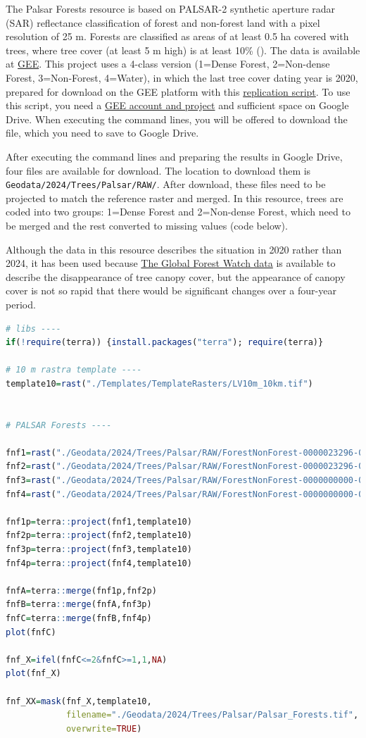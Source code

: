 \documentclass[
]{book}
\newcommand{\passthrough}[1]{#1}
\begin{document}
The Palsar Forests resource is based on PALSAR-2 synthetic aperture radar (SAR)
reflectance classification of forest and non-forest land with a pixel
resolution of 25 m. Forests are classified as areas of at least 0.5 ha covered
with trees, where tree cover (at least 5 m high) is at least 10\% ().
The data is available at \href{https://developers.google.com/earth-engine/datasets/catalog/JAXA_ALOS_PALSAR_YEARLY_FNF4}{GEE}.
This project uses a 4-class version (1=Dense Forest, 2=Non-dense Forest,
3=Non-Forest, 4=Water), in which the last tree cover dating year is 2020,
prepared for download on the GEE platform with this
\href{https://code.earthengine.google.com/3ec78ab057e6c8910cb1546002132b34}{replication script}.
To use this script, you need a \href{https://console.cloud.google.com/earth-engine/welcome}{GEE account and project}
and sufficient space on Google Drive. When executing the command lines, you will
be offered to download the file, which you need to save to Google Drive.

After executing the command lines and preparing the results in Google Drive,
four files are available for download. The location to download them is
\passthrough{\lstinline!Geodata/2024/Trees/Palsar/RAW/!}. After download, these files need to be projected
to match the reference raster and merged. In this resource, trees are coded into
two groups: 1=Dense Forest and 2=Non-dense Forest, which need to be merged and
the rest converted to missing values (code below).

Although the data in this resource describes the situation in 2020 rather
than 2024, it has been used because \hyperref[Ch04.09]{The Global Forest Watch data} is
available to describe the disappearance of tree canopy cover, but the appearance
of canopy cover is not so rapid that there would be significant changes over a
four-year period.

\begin{lstlisting}[language=R]
# libs ----
if(!require(terra)) {install.packages("terra"); require(terra)}

# 10 m rastra template ----
template10=rast("./Templates/TemplateRasters/LV10m_10km.tif")


# PALSAR Forests ----

fnf1=rast("./Geodata/2024/Trees/Palsar/RAW/ForestNonForest-0000023296-0000023296.tif")
fnf2=rast("./Geodata/2024/Trees/Palsar/RAW/ForestNonForest-0000023296-0000000000.tif")
fnf3=rast("./Geodata/2024/Trees/Palsar/RAW/ForestNonForest-0000000000-0000023296.tif")
fnf4=rast("./Geodata/2024/Trees/Palsar/RAW/ForestNonForest-0000000000-0000000000.tif")

fnf1p=terra::project(fnf1,template10)
fnf2p=terra::project(fnf2,template10)
fnf3p=terra::project(fnf3,template10)
fnf4p=terra::project(fnf4,template10)

fnfA=terra::merge(fnf1p,fnf2p)
fnfB=terra::merge(fnfA,fnf3p)
fnfC=terra::merge(fnfB,fnf4p)
plot(fnfC)

fnf_X=ifel(fnfC<=2&fnfC>=1,1,NA)
plot(fnf_X)

fnf_XX=mask(fnf_X,template10,
            filename="./Geodata/2024/Trees/Palsar/Palsar_Forests.tif",
            overwrite=TRUE)
\end{lstlisting}
\end{document}
